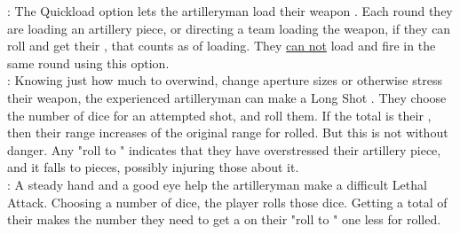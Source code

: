 \begin{multicols*}{2}
{: The Quickload option lets the artilleryman load their weapon . Each round they are  loading an artillery piece, or directing a team loading the weapon, if they can roll  and get their , that counts as  of loading. They \ul{can not} load and fire in the same round using this option.\\

: Knowing just how much to overwind, change aperture sizes or otherwise stress their weapon, the experienced artilleryman can make a Long Shot . They choose the number of dice for an attempted shot, and roll them. If the total is their , then their range increases  of the original range for  rolled. But this is not without danger. Any "roll to "  indicates that they have overstressed their artillery piece, and it falls to pieces, possibly injuring those about it.\\

: A steady hand and a good eye help the artilleryman make a difficult Lethal Attack. Choosing a number of dice, the player rolls those dice. Getting a total of their  makes the number they need to get a  on their "roll to " one less for  rolled. \\

}
\end{multicols*}
